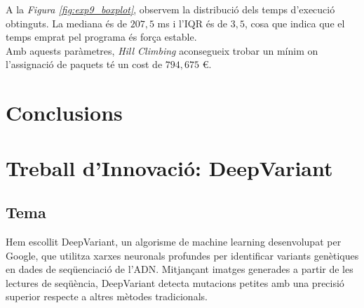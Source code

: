 \documentclass[a4paper]{article}
\begin{document}
	A la \textit{Figura \ref{fig:exp9_boxplot}}, observem la distribució dels temps d'execució obtinguts. La mediana és de $207,5$ ms i l'IQR és de $3,5$, cosa que indica que el temps emprat pel programa és força estable. \\
	
	Amb aquests paràmetres, \textit{Hill Climbing} aconsegueix trobar un mínim on l'assignació de paquets té un cost de $794,675$ €.
	
	\newpage
	\section{Conclusions}
	
	
	\newpage
	\section{Treball d'Innovació: DeepVariant}
	
	\subsection{Tema}
	Hem escollit DeepVariant, un algorisme de machine learning desenvolupat per Google, que utilitza xarxes neuronals profundes per identificar variants genètiques en dades de seqüenciació de l'ADN. Mitjançant imatges generades a partir de les lectures de seqüència, DeepVariant detecta mutacions petites amb una precisió superior respecte a altres mètodes tradicionals.
	
\end{document}
